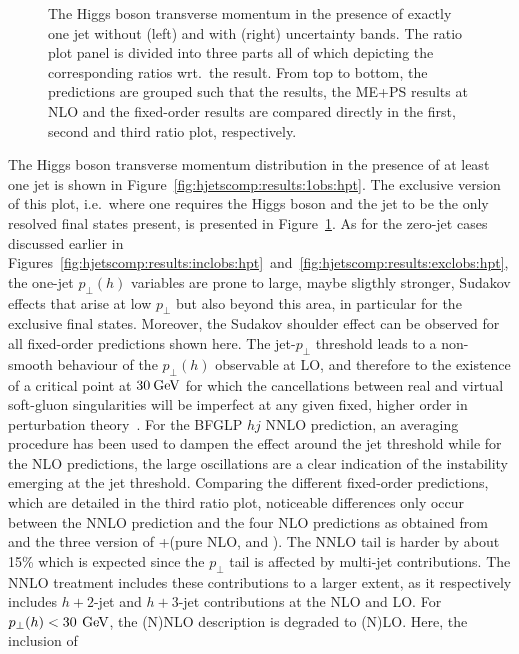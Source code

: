 \begin{figure}[t!]
  \caption{\label{fig:hjetscomp:results:1obs:hpt_excl}%
    The Higgs boson transverse momentum in the presence of exactly one
    jet without (left) and with (right) uncertainty bands. The ratio
    plot panel is divided into three parts all of which depicting the
    corresponding ratios wrt.~the \Powheg \NNLOPS result. From top to
    bottom, the predictions are grouped such that the \NNLOPS results,
    the ME+PS results at NLO and the fixed-order results are compared
    directly in the first, second and third ratio plot, respectively.}
\end{figure}

The Higgs boson transverse momentum distribution in the presence of at
least one jet is shown in
Figure~\ref{fig:hjetscomp:results:1obs:hpt}. The exclusive version of
this plot, i.e.~where one requires the Higgs boson and the jet to be 
the only resolved final states present,
is presented in Figure~\ref{fig:hjetscomp:results:1obs:hpt_excl}.  As
for the zero-jet cases discussed earlier in
Figures~\ref{fig:hjetscomp:results:inclobs:hpt}~and~\ref{fig:hjetscomp:results:exclobs:hpt},
the one-jet $p_\perp(h)$ variables are prone to large, maybe sligthly
stronger, Sudakov effects that arise at low $p_\perp$ but also beyond
this area, in particular for the exclusive final states. Moreover, the
Sudakov shoulder effect can be observed for all fixed-order
predictions shown here. The jet-$p_\perp$ threshold leads to a
non-smooth behaviour of the $p_\perp(h)$ observable at LO, and
therefore to the existence of a critical point at $30\text{\:GeV}$ for which
the cancellations between real and virtual soft-gluon singularities
will be imperfect at any given fixed, higher order in perturbation
theory~\cite{Catani:1997xc}. For the BFGLP $hj$ NNLO  prediction, an
averaging procedure has been used to dampen the effect around the jet
threshold while for the NLO predictions, the large oscillations are a
clear indication of the instability emerging at the jet threshold.
Comparing the different fixed-order predictions, which are detailed in 
the third ratio plot, noticeable differences only
occur between the NNLO prediction and the four NLO predictions as
obtained from \Powheg and the three version of \GoSam{}+\Sherpa (pure
NLO, \Minlo and \Loopsim). The NNLO tail is harder by about 15\% which
is expected since the $p_\perp$ tail is affected by multi-jet
contributions. The NNLO treatment includes these contributions to a
larger extent, as it respectively includes $h+2$-jet and
$h+3$-jet contributions at the NLO and LO. For $p_\perp(h)< 30\,\text{\:GeV}$, 
the (N)NLO description is degraded to (N)LO. Here, the inclusion of 
